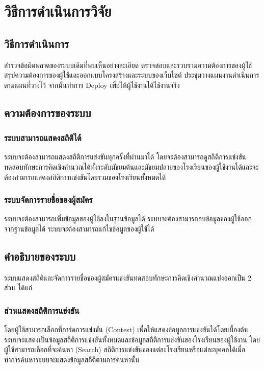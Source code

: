 \chapter{วิธีการดำเนินการวิจัย}
\label{chapter:experiment}

\section{วิธีการดำเนินการ}

สำรวจข้อผิดพลาดของระบบเดิมที่พบเห็นอย่างละเอียด ตรวจสอบและรวบรวมความต้องการของผู้ใช้ สรุปความต้องการของผู้ใช้และออกแบบโครงสร้างและระบบของเว็บไซต์ ประชุมวางแผนงานดำเนินการตามแผนที่วางไว้ จากนั้นทำการ Deploy เพื่อให้ผู้ใช้งานได้ใช้งานจริง

\section{ความต้องการของระบบ}

\subsection{ระบบสามารถแสดงสถิติได้}

ระบบจะต้องสามารถแสดงสถิติการแข่งขันทุกครั้งที่ผ่านมาได้ โดยจะต้องสามารถดูสถิติการแข่งขันทดสอบทักษะการคิดเชิงคำนวณได้ทั้งระดับมัธยมต้นและมัธยมปลายของโรงเรียนของผู้ใช้งานได้และจะต้องสามารถแสดงสถิติการแข่งขันโดยรวมของโรงเรียนทั้งหมดได้

\subsection{ระบบจัดการรายชื่อของผู้สมัคร}

ระบบจะต้องสามารถเพิ่มข้อมูลของผู้ใช้ลงในฐานข้อมูลได้ ระบบจะต้องสามารถลบข้อมูลของผู้ใช้ออกจากฐานข้อมูลได้ ระบบจะต้องสามารถแก้ไขข้อมูลของผู้ใช้ได้

\section{คำอธิบายของระบบ}

ระบบแสดงสถิติและจัดการรายชื่อของผู้สมัครแข่งขันทดสอบทักษะการคิดเชิงคำนวณแบ่งออกเป็น 2 ส่วน ได้แก่

\subsection{ส่วนแสดงสถิติการแข่งขัน}

โดยผู้ใช้สามารถเลือกที่การ์ดการแข่งขัน (Contest) เพื่อให้แสดงข้อมูลการแข่งขันได้โดยเบื้องต้นระบบจะแสดงเป็นข้อมูลสถิติการแข่งขันทั้งหมดและข้อมูลสถิติการแข่งขันของโรงเรียนของผู้ใช้งาน โดยผู้ใช้สามารถเลือกที่จะค้นหา (Search) สถิติการแข่งขันของแต่ละโรงเรียนหรือแต่ละบุคคลได้เมื่อทำการค้นหาระบบจะแสดงข้อมูลสถิติตามการค้นหานั้น


